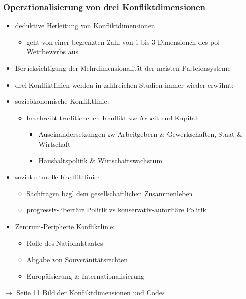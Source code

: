 \documentclass[11pt]{article}
\begin{document}
\subsubsection{Operationalisierung von drei Konfliktdimensionen}
\label{sec:orgfa5a62f}
\begin{itemize}
\item deduktive Herleitung von Konfliktdimensionen
\begin{itemize}
\item geht von einer begrenzten Zahl von 1 bis 3 Dimensionen des pol Wettbewerbs aus
\end{itemize}
\item Berücksichtigung der Mehrdimensionalität der meisten Parteiensysteme
\item drei Konfliktlinien werden in zahlreichen Studien immer wieder erwähnt:
\item sozioökonomische Konfliktlinie:
\begin{itemize}
\item beschreibt traditionellen Konflikt zw Arbeit und Kapital
\begin{itemize}
\item Auseinandersetzungen zw Arbeitgebern \& Gewerkschaften, Staat \& Wirtschaft
\item Haushaltspolitik \& Wirtschaftswachstum
\end{itemize}
\end{itemize}
\item soziokulturelle Konfliktlinie:
\begin{itemize}
\item Sachfragen bzgl dem gesellschaftlichen Zusammenleben
\item progressiv-libertäre Politik vs konservativ-autoritäre Politik
\end{itemize}
\item Zentrum-Peripherie Konfliktlinie:
\begin{itemize}
\item Rolle des Nationalstaates
\item Abgabe von Souveränitätsrechten
\item Europäisierung \& Internationalisierung
\end{itemize}
\end{itemize}

\(\rightarrow\) Seite 11 Bild der Konfliktdimensionen und Codes
\end{document}
